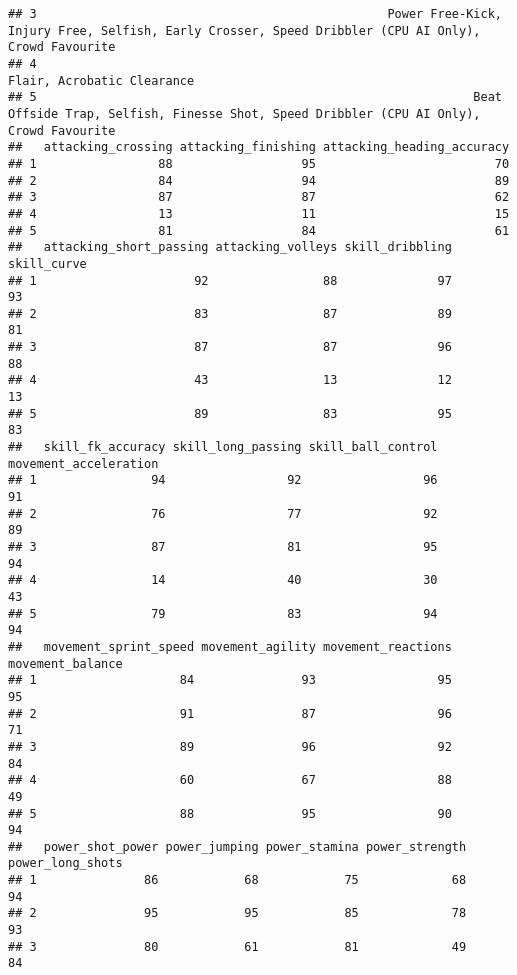 \documentclass[
]{article}
\begin{document}
\begin{verbatim}
## 3                                                 Power Free-Kick, Injury Free, Selfish, Early Crosser, Speed Dribbler (CPU AI Only), Crowd Favourite
## 4                                                                                                                          Flair, Acrobatic Clearance
## 5                                                             Beat Offside Trap, Selfish, Finesse Shot, Speed Dribbler (CPU AI Only), Crowd Favourite
##   attacking_crossing attacking_finishing attacking_heading_accuracy
## 1                 88                  95                         70
## 2                 84                  94                         89
## 3                 87                  87                         62
## 4                 13                  11                         15
## 5                 81                  84                         61
##   attacking_short_passing attacking_volleys skill_dribbling skill_curve
## 1                      92                88              97          93
## 2                      83                87              89          81
## 3                      87                87              96          88
## 4                      43                13              12          13
## 5                      89                83              95          83
##   skill_fk_accuracy skill_long_passing skill_ball_control movement_acceleration
## 1                94                 92                 96                    91
## 2                76                 77                 92                    89
## 3                87                 81                 95                    94
## 4                14                 40                 30                    43
## 5                79                 83                 94                    94
##   movement_sprint_speed movement_agility movement_reactions movement_balance
## 1                    84               93                 95               95
## 2                    91               87                 96               71
## 3                    89               96                 92               84
## 4                    60               67                 88               49
## 5                    88               95                 90               94
##   power_shot_power power_jumping power_stamina power_strength power_long_shots
## 1               86            68            75             68               94
## 2               95            95            85             78               93
## 3               80            61            81             49               84

\end{verbatim}
\end{document}
